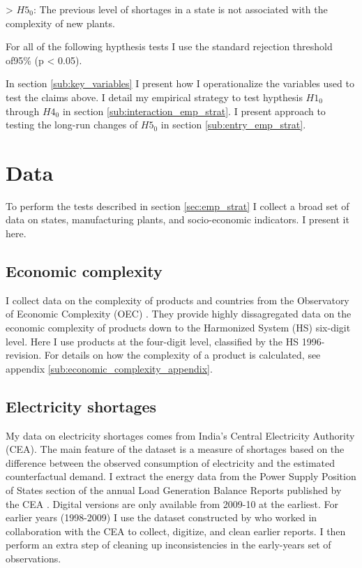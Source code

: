 \documentclass[11pt]{article}
\begin{document}
> $H5_{0}$: The previous level of shortages in a state is not associated with the complexity of new plants.

For all of the following hypthesis tests I use the standard rejection threshold of95\% (p < 0.05).

In section \ref{sub:key_variables} I present how I operationalize the variables used to test the claims above. I detail my empirical strategy to test hypthesis $H1_0$ through $H4_0$ in section \ref{sub:interaction_emp_strat}. I present approach to testing the  long-run changes of $H5_0$ in section \ref{sub:entry_emp_strat}.

 \newpage

\section{Data}%
\label{sub:data}

To perform the tests described in section \ref{sec:emp_strat} I collect a broad set of data on states, manufacturing plants, and socio-economic indicators. I present it here.

\subsection{Economic complexity}%
\label{sub:international_trade_data}
I collect data on the complexity of products and countries from the Observatory of Economic Complexity (OEC) \citep{simoes_economic_2011}. They provide highly dissagregated data on the economic complexity of products down to the Harmonized System (HS) six-digit level. Here I use products at the four-digit level, classified by the HS 1996-revision. For details on how the complexity of a product is calculated, see appendix \ref{sub:economic_complexity_appendix}.

\subsection{Electricity shortages}%
\label{sub:energy_data}
My data on electricity shortages comes from India's Central Electricity Authority (CEA). The main feature of the dataset is a measure of shortages based on the difference between the observed consumption of electricity and the estimated counterfactual demand. I extract the energy data from the Power Supply Position of States section of the annual Load Generation Balance Reports published by the CEA \citep{cea_load_2009}. Digital versions are only available from 2009-10 at the earliest. For earlier years (1998-2009) I use the dataset constructed by \cite{allcott_how_2016} who worked in collaboration with the CEA to collect, digitize, and clean earlier reports. I then perform an extra step of cleaning up inconsistencies in the early-years set of observations.
\end{document}
